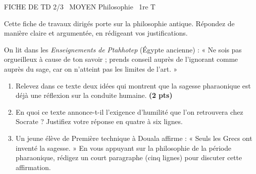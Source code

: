 \documentclass[11pt]{article}
\begin{document}
\begin{tcolorbox}[enhanced,colback=popink,colframe=popink,arc=10pt,boxrule=0pt,left=12pt,right=12pt,top=9pt,bottom=9pt]
{\color{white}\popxbold\small FICHE DE TD 2/3 \textbullet\ MOYEN \hfill Philosophie \textbullet\ 1re T\par}
\end{tcolorbox}
\vspace{4pt}
Cette fiche de travaux dirigés porte sur la philosophie antique. Répondez de manière claire et argumentée, en rédigeant vos justifications.

\begin{exercice}
On lit dans les \emph{Enseignements de Ptahhotep} (Égypte ancienne) : « Ne sois pas orgueilleux à cause de ton savoir ; prends conseil auprès de l'ignorant comme auprès du sage, car on n'atteint pas les limites de l'art. »
\begin{enumerate}
\item Relevez dans ce texte deux idées qui montrent que la sagesse pharaonique est déjà une réflexion sur la conduite humaine. \textbf{(2 pts)}
\item En quoi ce texte annonce-t-il l'exigence d'humilité que l'on retrouvera chez Socrate ? Justifiez votre réponse en quatre à six lignes.
\item Un jeune élève de Première technique à Douala affirme : « Seuls les Grecs ont inventé la sagesse. » En vous appuyant sur la philosophie de la période pharaonique, rédigez un court paragraphe (cinq lignes) pour discuter cette affirmation.
\end{enumerate}
\end{exercice}
\end{document}
